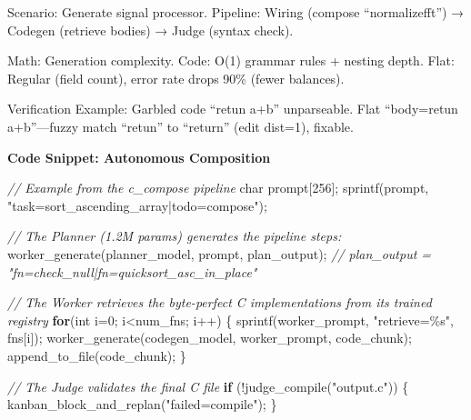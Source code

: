 \documentclass[
]{article}
\newenvironment{Shaded}{}{}
\newcommand{\CommentTok}[1]{\textcolor[rgb]{0.38,0.63,0.69}{\textit{#1}}}
\newcommand{\ControlFlowTok}[1]{\textcolor[rgb]{0.00,0.44,0.13}{\textbf{#1}}}
\newcommand{\DataTypeTok}[1]{\textcolor[rgb]{0.56,0.13,0.00}{#1}}
\newcommand{\DecValTok}[1]{\textcolor[rgb]{0.25,0.63,0.44}{#1}}
\newcommand{\NormalTok}[1]{#1}
\newcommand{\OperatorTok}[1]{\textcolor[rgb]{0.40,0.40,0.40}{#1}}
\newcommand{\SpecialCharTok}[1]{\textcolor[rgb]{0.25,0.44,0.63}{#1}}
\newcommand{\StringTok}[1]{\textcolor[rgb]{0.25,0.44,0.63}{#1}}
\begin{document}
Scenario: Generate signal processor. Pipeline: Wiring (compose
``normalize\textbar fft'') → Codegen (retrieve bodies) → Judge (syntax
check).

Math: Generation complexity. Code: O(1) grammar rules + nesting depth.
Flat: Regular (field count), error rate drops 90\% (fewer balances).

Verification Example: Garbled code ``retun a+b'' unparseable. Flat
``body=retun a+b''---fuzzy match ``retun'' to ``return'' (edit dist=1),
fixable.

\textbf{Code Snippet: Autonomous Composition}

\begin{Shaded}
\begin{Highlighting}[]
\CommentTok{// Example from the c\_compose pipeline}
\DataTypeTok{char}\NormalTok{ prompt}\OperatorTok{[}\DecValTok{256}\OperatorTok{];}
\NormalTok{sprintf}\OperatorTok{(}\NormalTok{prompt}\OperatorTok{,} \StringTok{"task=sort\_ascending\_array|todo=compose"}\OperatorTok{);}

\CommentTok{// The Planner (1.2M params) generates the pipeline steps:}
\NormalTok{worker\_generate}\OperatorTok{(}\NormalTok{planner\_model}\OperatorTok{,}\NormalTok{ prompt}\OperatorTok{,}\NormalTok{ plan\_output}\OperatorTok{);}
\CommentTok{// plan\_output = "fn=check\_null|fn=quicksort\_asc\_in\_place"}

\CommentTok{// The Worker retrieves the byte{-}perfect C implementations from its trained registry}
\ControlFlowTok{for}\OperatorTok{(}\DataTypeTok{int}\NormalTok{ i}\OperatorTok{=}\DecValTok{0}\OperatorTok{;}\NormalTok{ i}\OperatorTok{\textless{}}\NormalTok{num\_fns}\OperatorTok{;}\NormalTok{ i}\OperatorTok{++)} \OperatorTok{\{}
\NormalTok{    sprintf}\OperatorTok{(}\NormalTok{worker\_prompt}\OperatorTok{,} \StringTok{"retrieve=}\SpecialCharTok{\%s}\StringTok{"}\OperatorTok{,}\NormalTok{ fns}\OperatorTok{[}\NormalTok{i}\OperatorTok{]);}
\NormalTok{    worker\_generate}\OperatorTok{(}\NormalTok{codegen\_model}\OperatorTok{,}\NormalTok{ worker\_prompt}\OperatorTok{,}\NormalTok{ code\_chunk}\OperatorTok{);}
\NormalTok{    append\_to\_file}\OperatorTok{(}\NormalTok{code\_chunk}\OperatorTok{);}
\OperatorTok{\}}

\CommentTok{// The Judge validates the final C file}
\ControlFlowTok{if} \OperatorTok{(!}\NormalTok{judge\_compile}\OperatorTok{(}\StringTok{"output.c"}\OperatorTok{))} \OperatorTok{\{}
\NormalTok{    kanban\_block\_and\_replan}\OperatorTok{(}\StringTok{"failed=compile"}\OperatorTok{);}
\OperatorTok{\}}
\end{Highlighting}
\end{Shaded}
\end{document}
